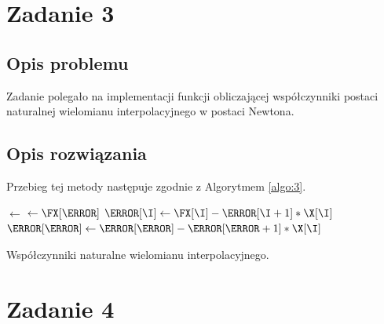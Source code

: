 \documentclass{classrep}
\begin{document}
\section{Zadanie 3}
	\subsection{Opis problemu}
		Zadanie polegało na implementacji funkcji obliczającej współczynniki postaci naturalnej wielomianu interpolacyjnego w postaci Newtona.
		
		
	\subsection{Opis rozwiązania}
		Przebieg tej metody następuje zgodnie z Algorytmem \ref{algo:3}.
	
		\begin{algorithm}[!htbp]
			

		    	\Fun{\F{\X, \FX}} {
		    		\N $\gets$ \LEN{\FX}\;
		    		\A[\N] $\gets \FX[\N]$\;
		    		 {
		    			$\A[\I] \gets \FX[\I] - \A[\I+1] * \X[\I]$\; 
		    			 {
		    				$\A[\J] \gets \A[\J] - \A[\J+1] * \X[\I]$\; 	
					}	
		    		}
		    		\KwRet \A\;
    			}

    			\caption{Współczynniki naturalne wielomianu interpolacyjnego.}
    			\label{algo:3}
		\end{algorithm}	
				

\section{Zadanie 4}
\end{document}
